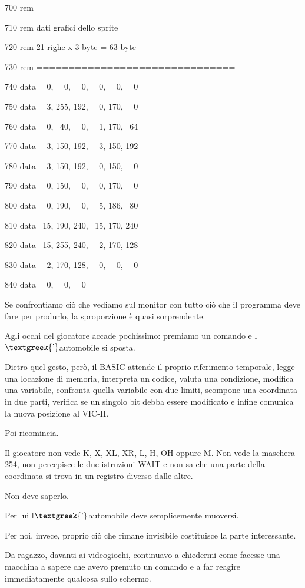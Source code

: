 \documentclass{article}
\begin{document}
700 rem ===============================

710 rem dati grafici dello sprite

720 rem 21 righe x 3 byte = 63 byte

730 rem ===============================

740 data \ \ 0, \ \ 0, \ \ 0, \ \ 0, \ \ 0, \ \ 0

750 data \ \ 3, 255, 192, \ \ 0, 170, \ \ 0

760 data \ \ 0, \ 40, \ \ 0, \ \ 1, 170, \ 64

770 data \ \ 3, 150, 192, \ \ 3, 150, 192

780 data \ \ 3, 150, 192, \ \ 0, 150, \ \ 0

790 data \ \ 0, 150, \ \ 0, \ \ 0, 170, \ \ 0

800 data \ \ 0, 190, \ \ 0, \ \ 5, 186, \ 80

810 data \ 15, 190, 240, \ 15, 170, 240

820 data \ 15, 255, 240, \ \ 2, 170, 128

830 data \ \ 2, 170, 128, \ \ 0, \ \ 0, \ \ 0

840 data \ \ 0, \ \ 0, \ \ 0

Se confrontiamo ciò che vediamo sul monitor con tutto ciò che il programma deve fare per produrlo, la sproporzione è
quasi sorprendente.

Agli occhi del giocatore accade pochissimo: premiamo un comando e l$\text{\textgreek{’}}$automobile si sposta.

Dietro quel gesto, però, il BASIC attende il proprio riferimento temporale, legge una locazione di memoria, interpreta
un codice, valuta una condizione, modifica una variabile, confronta quella variabile con due limiti, scompone una
coordinata in due parti, verifica se un singolo bit debba essere modificato e infine comunica la nuova posizione al
VIC-II.

Poi ricomincia.

Il giocatore non vede K, X, XL, XR, L, H, OH oppure M. Non vede la maschera 254, non percepisce le due istruzioni WAIT e
non sa che una parte della coordinata si trova in un registro diverso dalle altre.

Non deve saperlo.

Per lui l$\text{\textgreek{’}}$automobile deve semplicemente muoversi.

Per noi, invece, proprio ciò che rimane invisibile costituisce la parte interessante.

Da ragazzo, davanti ai videogiochi, continuavo a chiedermi come facesse una macchina a sapere che avevo premuto un
comando e a far reagire immediatamente qualcosa sullo schermo.
\end{document}
